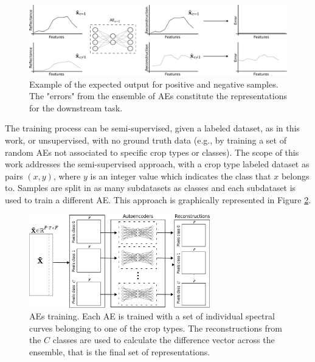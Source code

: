 \documentclass[journal,article,submit,pdftex,moreauthors]{Definitions/mdpi}
\begin{document}
\begin{figure}[H]
	\includegraphics[width=\textwidth]{figures/AE_example_corrected.pdf}
	\caption{Example of the expected output for positive and negative samples. The "errors" from the ensemble of AEs constitute the representations for the downstream task.}
	\label{errors}
\end{figure}
The training process can be semi-supervised, given a labeled dataset, as in this work, or unsupervised, with no ground truth data (e.g., by training a set of random AEs not associated to specific crop types or classes). 
The scope of this work addresses the semi-supervised approach, with a crop type labeled dataset as pairs $(x,y)$, where $y$ is an integer value which indicates the class that $x$ belongs to. Samples are split in as many subdatasets as classes and each subdataset is used to train a different AE.
This approach is graphically represented in Figure \ref{aes_train}. 
\begin{figure}[H]
	\centering
	\includegraphics[width=0.7\textwidth]{figures/training.pdf}
	\caption{AEs training. Each AE is trained with a set of individual spectral curves belonging to one of the crop types. The reconstructions from the $C$ classes are used to calculate the difference vector across the ensemble, that is the final set of representations.}    
	\label{aes_train}      
\end{figure}
\end{document}
